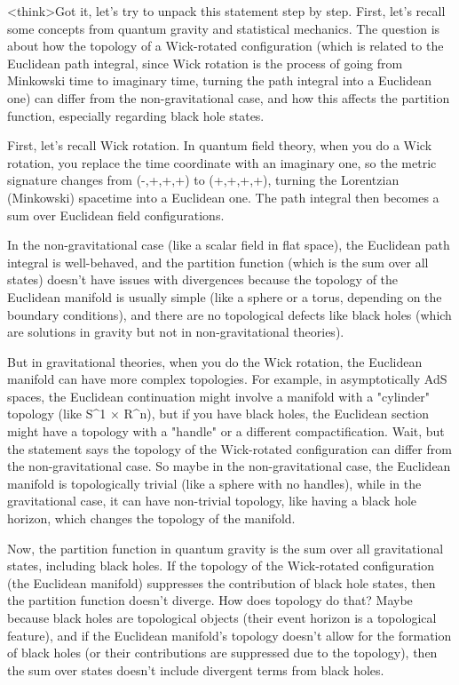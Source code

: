 <think>Got it, let's try to unpack this statement step by step. First, let's recall some concepts from quantum gravity and statistical mechanics. The question is about how the topology of a Wick-rotated configuration (which is related to the Euclidean path integral, since Wick rotation is the process of going from Minkowski time to imaginary time, turning the path integral into a Euclidean one) can differ from the non-gravitational case, and how this affects the partition function, especially regarding black hole states.

First, let's recall Wick rotation. In quantum field theory, when you do a Wick rotation, you replace the time coordinate with an imaginary one, so the metric signature changes from (-,+,+,+) to (+,+,+,+), turning the Lorentzian (Minkowski) spacetime into a Euclidean one. The path integral then becomes a sum over Euclidean field configurations.

In the non-gravitational case (like a scalar field in flat space), the Euclidean path integral is well-behaved, and the partition function (which is the sum over all states) doesn't have issues with divergences because the topology of the Euclidean manifold is usually simple (like a sphere or a torus, depending on the boundary conditions), and there are no topological defects like black holes (which are solutions in gravity but not in non-gravitational theories).

But in gravitational theories, when you do the Wick rotation, the Euclidean manifold can have more complex topologies. For example, in asymptotically AdS spaces, the Euclidean continuation might involve a manifold with a "cylinder" topology (like S^1 × R^n), but if you have black holes, the Euclidean section might have a topology with a "handle" or a different compactification. Wait, but the statement says the topology of the Wick-rotated configuration can differ from the non-gravitational case. So maybe in the non-gravitational case, the Euclidean manifold is topologically trivial (like a sphere with no handles), while in the gravitational case, it can have non-trivial topology, like having a black hole horizon, which changes the topology of the manifold.

Now, the partition function in quantum gravity is the sum over all gravitational states, including black holes. If the topology of the Wick-rotated configuration (the Euclidean manifold) suppresses the contribution of black hole states, then the partition function doesn't diverge. How does topology do that? Maybe because black holes are topological objects (their event horizon is a topological feature), and if the Euclidean manifold's topology doesn't allow for the formation of black holes (or their contributions are suppressed due to the topology), then the sum over states doesn't include divergent terms from black holes.

